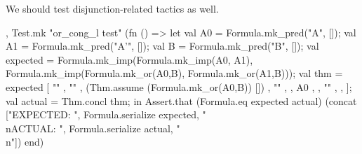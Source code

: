 \begin{node}
We should test disjunction-related tactics as well.
\end{node}

\nwenddocs{}\plusendmoddef\nwstartdeflinemarkup{}\nwenddeflinemarkup
, Test.mk "or_cong_l  test" (fn () =>
    let
      val A0 = Formula.mk_pred("A", []);
      val A1 = Formula.mk_pred("A'", []);
      val B = Formula.mk_pred("B", []);
      val expected = Formula.mk_imp(Formula.mk_imp(A0, A1),
                                    Formula.mk_imp(Formula.mk_or(A0,B),
                                                   Formula.mk_or(A1,B)));
      val thm =  expected
                             [  ""
                             ,  ""
                             ,  (Thm.assume (Formula.mk_or(A0,B)) [])
                             ,  ""
                             , 
                             ,  A0
                             , 
                             ,  ""
                             , 
                             ,  ];
      val actual = Thm.concl thm;
    in
      Assert.that (Formula.eq expected actual)
                  (concat ["EXPECTED: ",
                           Formula.serialize expected,
                           "\\nACTUAL: ",
                           Formula.serialize actual,
                           "\\n"])
    end)

